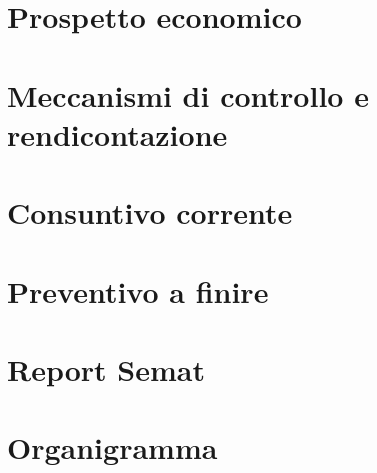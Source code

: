 \section{Prospetto economico}

\newpage
\section{Meccanismi di controllo e rendicontazione}

\newpage
\section{Consuntivo corrente}

\newpage
\section{Preventivo a finire}

\newpage
\appendix 
\section{Report Semat}

\newpage
\section{Organigramma}

\newpage



